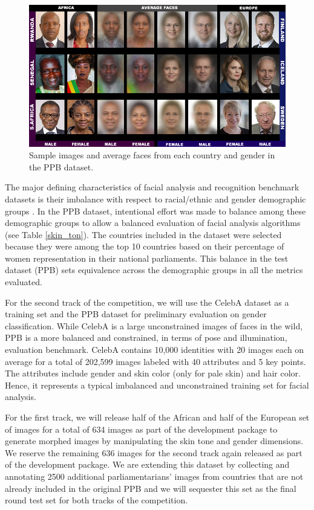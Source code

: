 \documentclass[11pt, oneside]{article}
\makeatletter
\let\@internalcite\cite
\def\cite{\def\citeauthoryear##1##2{##1, ##2}\@internalcite}
\makeatother
\begin{document}
\begin{figure}[t]
    \label{fig_ppb}
    \centering
    \includegraphics[width=140mm]{fig/ppb}
    \caption{Sample images and average faces from each country and gender in 
    	the PPB dataset.}
\end{figure}



The major defining characteristics of facial analysis and recognition benchmark 
datasets is their imbalance with respect to racial/ethnic and gender 
demographic groups \cite{phillips2011other, han2015demographic}. In the PPB 
dataset, intentional effort was made to balance among these demographic groups 
to allow a balanced evaluation of facial analysis algorithms (see Table 
\ref{skin_ton}). The countries included in the dataset were selected because 
they were among the top 10 countries based on their percentage of women 
representation in their national parliaments. This balance in the test dataset 
(PPB) sets equivalence across the demographic groups in all the metrics 
evaluated.



For the second track of the competition, we will use the CelebA dataset 
\cite{liu2015deep} as a training set and the PPB dataset for preliminary 
evaluation on gender classification. While CelebA is a large unconstrained 
images of faces in the wild, PPB is a more balanced and constrained, in terms 
of pose and illumination, evaluation benchmark. CelebA contains 10,000 
identities with 20 images each on average for a total of 202,599 images labeled 
with 40 attributes and 5 key points. The attributes include gender and skin 
color (only for pale skin) and hair color. Hence, it represents a typical 
imbalanced and unconstrained training set for facial analysis.

For the first track, we will release half of the African and half of the 
European set of images for a total of 634 images as part of the development 
package to generate morphed images by manipulating the skin tone and gender 
dimensions. We reserve the remaining 636 images for the second track again 
released as part of the development package. We are extending this dataset by 
collecting and annotating 2500 additional parliamentarians' images from 
countries that are not already included in the original PPB and we will 
sequester this set as the final round test set for both tracks of the 
competition.
\end{document}
